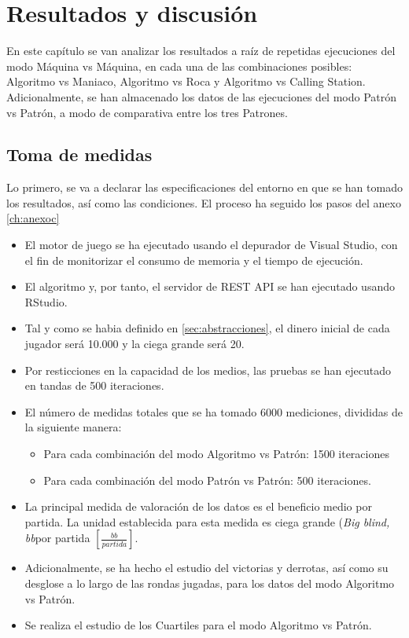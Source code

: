 \chapter{Resultados y discusión}

En este capítulo se van analizar los resultados  a raíz de repetidas ejecuciones del modo Máquina vs Máquina, en cada una de las combinaciones posibles: Algoritmo vs Maniaco, Algoritmo vs Roca y Algoritmo vs Calling Station. Adicionalmente, se han almacenado los datos de las ejecuciones del modo Patrón vs Patrón, a modo de comparativa entre los tres Patrones.

\section{Toma de medidas}
\label{sec:toma}

Lo primero, se va a declarar las especificaciones del entorno en que se han tomado los resultados, así como las condiciones. El proceso ha seguido los pasos del anexo \ref{ch:anexoc}

\begin{itemize}
\item El motor de juego se ha ejecutado usando el depurador de Visual Studio, con el fin de monitorizar el consumo de memoria y el tiempo de ejecución.
\item El algoritmo y, por tanto, el servidor de REST API se han ejecutado usando RStudio.
\item Tal y como se habia definido en \ref{sec:abstracciones}, el dinero inicial de cada jugador será 10.000 y la ciega grande será 20.
\item Por resticciones en la capacidad de los medios, las pruebas se han ejecutado en tandas de 500 iteraciones.
\item El número de medidas totales que se ha tomado 6000 mediciones, divididas de la siguiente manera:
\begin{itemize}
\item Para cada combinación del modo Algoritmo vs Patrón: 1500 iteraciones
\item Para cada combinación del modo Patrón vs Patrón: 500 iteraciones.
\end{itemize} 
\item La principal medida de valoración de los datos es el beneficio medio por partida. La unidad establecida \cite{chen} para esta medida es ciega grande (\textit{Big blind, bb}por partida $\left[\frac{bb}{partida}\right]$.
\item Adicionalmente, se ha hecho el estudio del victorias y derrotas, así como su desglose a lo largo de las rondas jugadas, para los datos del modo Algoritmo vs Patrón.
\item Se realiza el estudio de los Cuartiles para el modo Algoritmo vs Patrón.
\end{itemize} 

